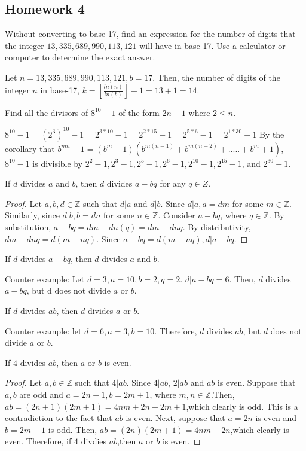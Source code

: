 \begin{problem}
\section{Homework 4}
\begin{problem}  Without converting to base-17, find an expression for the number of digits that the integer
$13,335,689,990,113,121$ will have in base-17. Use a calculator or computer to determine the exact
answer.
\end{problem}
\solution 
Let $n = 13,335,689,990,113,121, b = 17$. 
Then, the number of digits of the integer $n$ in base-17, $k = [\frac{ln(n)}{ln(b)}] + 1 = 13 + 1 = 14$. 
\begin{problem}
 Find all the divisors of $8^{10} - 1$ of the form $2n - 1$ where $2 \leq n$.
\end{problem}
\solution 
$8^{10}-1 = (2^{3})^{10}-1 = 2^{3*10} - 1 = 2^{2*15} - 1 = 2^{5*6} - 1 = 2^{1*30}-1$
By the corollary that $b^{mn}-1 = (b^{m}-1)(b^{m(n-1)} + b^{m(n-2)} + .....+ b^{m} +1)$, $8^{10} - 1$ is divisible by $2^{2}-1, 2^{3}-1, 2^{5}-1, 2^{6}-1, 2^{10}-1, 2^{15}-1$, and $2^{30}-1$.
\begin{problem}
If $d$ divides $a$ and $b$, then $d$ divides $a - bq$ for any $q \in Z$.
\end{problem}
\solution
\begin{proof} 
Let $a,b,d \in \mathbb{Z}$ such that $d|a$ and $d|b$. Since $d|a, a = dm$ for some $m \in \mathbb{Z}$. Similarly, since $d|b, b = dn$ for some $n \in \mathbb{Z}$. Consider $a-bq$, where $q \in \mathbb{Z}$. By substitution, $a-bq=dm-dn(q)=dm-dnq$. By distributivity, $dm-dnq=d(m-nq)$. Since $a-bq=d(m-nq), d|a-bq$.
\end{proof}
\begin{problem} If $d$ divides $a-bq$, then $d$ divides $a$ and $b$.
\end{problem}
\solution
Counter example: Let $d=3,a=10,b=2,q=2$. $d|a-bq=6$. Then, $d$ divides $a-bq$, but d does not divide $a$ or $b$.
\begin{problem} If $d$ divides $ab$, then $d$ divides $a$ or $b$.
\end{problem}
\solution
Counter example: let $d=6,a=3,b=10$. Therefore, $d$ divides $ab$, but $d$ does not divide $a$ or $b$. 
\begin{problem} If $4$ divides $ab$, then $a$ or $b$ is even.
\end{problem}
\solution
\begin{proof}
Let $a,b \in \mathbb{Z}$ such that $4|ab$. 
Since $4|ab$, $2|ab$ and $ab$ is even. 
Suppose that $a,b$ are odd and $a=2n+1, b=2m+1$, where $m,n \in \mathbb{Z}$.Then, $ab=(2n+1)(2m+1)=4nm+2n+2m+1$,which clearly is odd. This is a contradiction to the fact that $ab$ is even.
Next, suppose that $a=2n$ is even and $b=2m+1$ is odd. Then, $ab=(2n)(2m+1)=4nm+2n$,which clearly is even.  
Therefore, if $4$ divdies $ab$,then $a$ or $b$ is even. 


\end{proof}
\end{problem}
